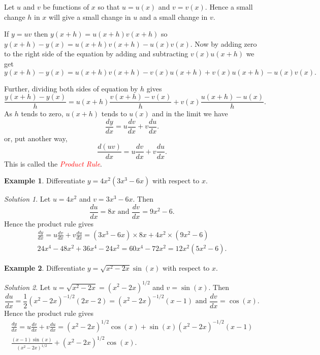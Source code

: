 \documentclass[
  11pt,
  oneside]{book}
\newcommand{\slide}{}
\theoremstyle{definition}
\theoremstyle{definition}
\newtheorem{example}{Example}[chapter]
\theoremstyle{definition}
\theoremstyle{definition}
\theoremstyle{remark}
\newtheorem*{solution}{Solution}
\begin{document}
Let \(u\) and \(v\) be functions of \(x\) so that \(u = u(x)\) and \(v = v(x)\). Hence a small change \(h\) in \(x\) will give a small change in \(u\) and a small change in \(v\).

If \(y = uv\) then \(y(x+h) = u(x+h)v(x+h)\) so \(y(x+h)-y(x) = u(x+h)v(x+h) - u(x)v(x)\). Now by adding zero to the right side of the equation by adding and subtracting \(v(x)u(x+h)\) we get
\[
y(x+h)-y(x) = u(x+h)v(x+h) - v(x)u(x+h) + v(x)u(x+h ) - u(x)v(x).
\]
\slide
Further, dividing both sides of equation by \(h\) gives
\[
\frac{y(x+h)-y(x)}{h} = u(x+h)\frac{v(x+h) - v(x)}{h} + v(x)\frac{u(x+h ) - u(x)}{h}.
\]
As \(h\) tends to zero, \(u(x+h)\) tends to \(u(x)\) and in the limit we have
\[ 
\frac{dy}{dx} = u\frac{dv}{dx} + v\frac{du}{dx}.
\]
or, put another way,
\[ 
\frac{d(uv)}{dx} = u\frac{dv}{dx} + v\frac{du}{dx}.
\]
This is called the \textcolor{red}{\em Product Rule}.
\slide

\begin{example}
Differentiate \(y=4x^2(3x^3-6x)\) with respect to \(x\).
\end{example}

\begin{solution}
Let \(u = 4x^2\) and \(v = 3x^3-6x\). Then
\[
\frac{du}{dx} = 8x\text{ and }\frac{dv}{dx} = 9x^2-6.
\]
Hence the product rule gives
\begin{gather*}
\frac{dy}{dx} = u\frac{dv}{dx} + v\frac{du}{dx} = (3x^3-6x)\times 8x + 4x^2\times(9x^2-6)\\
24x^4 - 48x^2 + 36x^4-24x^2 = 60x^4-72x^2 = 12x^2(5x^2-6).
\end{gather*}
\end{solution}

\slide

\begin{example}
Differentiate \(y=\sqrt{x^2-2x}\sin(x)\) with respect to \(x\).
\end{example}

\begin{solution}
Let \(u = \sqrt{x^2-2x} = (x^2-2x)^{1/2}\) and \(v = \sin(x)\). Then
\[
\frac{du}{dx} = \frac12(x^2-2x)^{-1/2}(2x-2)=(x^2-2x)^{-1/2}(x-1)\text{ and }\frac{dv}{dx} = \cos(x).
\]
Hence the product rule gives
\begin{gather*}
\frac{dy}{dx} = u\frac{dv}{dx} + v\frac{du}{dx} = (x^2-2x)^{1/2}\cos(x) + \sin(x)(x^2-2x)^{-1/2}(x-1)\\
\frac{(x-1)\sin(x)}{(x^2-2x)^{1/2}} + (x^2-2x)^{1/2}\cos(x).
\end{gather*}
\end{solution}
\end{document}
